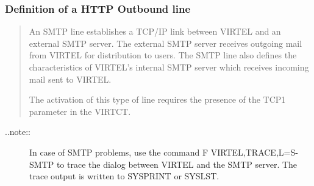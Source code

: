 \documentclass[letterpaper,10pt,english]{sphinxmanual}
\begin{document}
\subsubsection{Definition of a HTTP Outbound line}
\label{\detokenize{connectivity_guide:definition-of-a-http-outbound-line}}\begin{quote}

An SMTP line establishes a TCP/IP link between VIRTEL and an external SMTP server. The external SMTP server receives outgoing
mail from VIRTEL for distribution to users. The SMTP line also defines the characteristics of VIRTEL’s internal SMTP server which
receives incoming mail sent to VIRTEL.

The activation of this type of line requires the presence of the TCP1 parameter in the VIRTCT.
\end{quote}
\begin{description}
\item[{..note::}] \leavevmode
In case of SMTP problems, use the command F VIRTEL,TRACE,L=S-SMTP to trace the dialog between VIRTEL and the SMTP server. The trace output is written to SYSPRINT or SYSLST.

\end{description}
\end{document}
